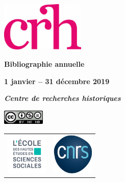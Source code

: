 \begin{titlepage}
\begin{center}

\vspace*{1,75cm}

\includegraphics[width=4cm]{img/logo_crh_magenta.png}
\bigskip
\bigskip
\bigskip
\bigskip

\begin{Huge}
\textbf{Bibliographie annuelle}
\end{Huge}

\bigskip

\begin{LARGE}
\textbf{1 janvier -- 31 décembre 2019}

\bigskip
\bigskip


\textbf{\emph{Centre de recherches historiques} }\\
\end{LARGE}

\bigskip
\bigskip


\vspace*{3cm}

\includegraphics[width=2cm]{img/licence-cc-icon.png}

\vspace*{3,5cm}

\begin{tabular}{cc}
    \includegraphics[width=2cm]{img/Logo_EHESS_2021_RVB.png} & \includegraphics[width=2cm]{img/cnrslogo.png} \\
\end{tabular}

\end{center}
\afterpage{\blankpage}
\end{titlepage}
